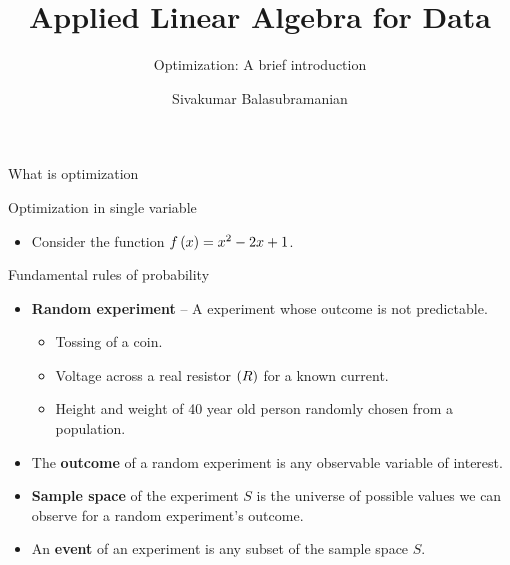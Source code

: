 \documentclass[aspectratio=169]{beamer}
\title{Applied Linear Algebra for Data}
\subtitle{Optimization: A brief introduction}
\author{Sivakumar Balasubramanian}
\institute[Christian Medical College] %
{
  \inst{}%
  Department of Bioengineering\\
  Christian Medical College, Bagayam\\
  Vellore 632002
}
\date{}
\let\olditem\item
\renewcommand{\item}{\setlength{\itemsep}{\fill}\olditem}
\def\lp{\ensuremath\left(}
\def\rp{\ensuremath\right)}
\newcommand{\ct}[1]{\lp #1\rp}
\begin{document}


\begin{frame}
  \titlepage
\end{frame}



\begin{frame}[t]{What is optimization}

\end{frame}


\begin{frame}[t]{Optimization in single variable}
\begin{itemize}
  \item Consider the function $f\ct{x} = x^2 - 2x + 1$.
\end{itemize}
\end{frame}


\begin{frame}[t]{Fundamental rules of probability}
\begin{itemize}
  \item \textbf{Random experiment} -- A experiment whose outcome is not predictable.
  
  \begin{itemize}
    \item Tossing of a coin.
    \item Voltage across a real resistor $\ct{R}$ for a known current.
    \item Height and weight of 40 year old person randomly chosen from a population.
  \end{itemize}

  \item The \textbf{outcome} of a random experiment is any observable variable of interest.

  \item \textbf{Sample space} of the experiment $S$ is the universe of possible values we can observe for a random experiment's outcome.

  \item An \textbf{event} of an experiment is any subset of the sample space $S$.
\end{itemize}
\end{frame}
\end{document}

